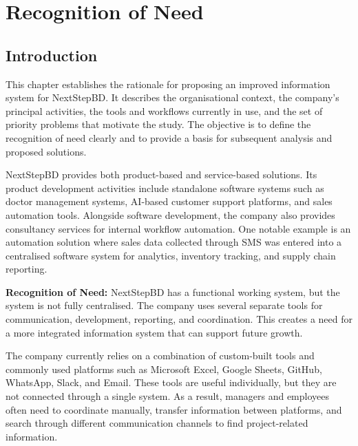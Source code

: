 \documentclass[12pt,a4paper]{report}
\begin{document}
\restoregeometry
\clearpage

\tableofcontents
\listoffigures
\listoftables
\newpage

\chapter{Recognition of Need}

\section{Introduction}
This chapter establishes the rationale for proposing an improved information system for NextStepBD. It describes the organisational context, the company's principal activities, the tools and workflows currently in use, and the set of priority problems that motivate the study. The objective is to define the recognition of need clearly and to provide a basis for subsequent analysis and proposed solutions.

NextStepBD provides both product-based and service-based solutions. Its product development activities include standalone software systems such as doctor management systems, AI-based customer support platforms, and sales automation tools. Alongside software development, the company also provides consultancy services for internal workflow automation. One notable example is an automation solution where sales data collected through SMS was entered into a centralised software system for analytics, inventory tracking, and supply chain reporting.

\begin{highlightBox}
\textbf{Recognition of Need:} NextStepBD has a functional working system, but the system is not fully centralised. The company uses several separate tools for communication, development, reporting, and coordination. This creates a need for a more integrated information system that can support future growth.
\end{highlightBox}

The company currently relies on a combination of custom-built tools and commonly used platforms such as Microsoft Excel, Google Sheets, GitHub, WhatsApp, Slack, and Email. These tools are useful individually, but they are not connected through a single system. As a result, managers and employees often need to coordinate manually, transfer information between platforms, and search through different communication channels to find project-related information.
\end{document}
